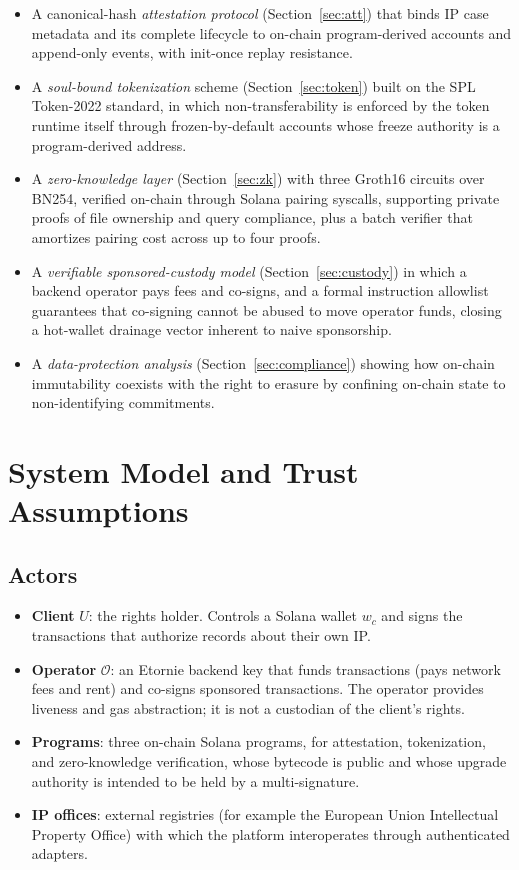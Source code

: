 \documentclass[conference]{IEEEtran}
\begin{document}
\begin{itemize}
\item A canonical-hash \emph{attestation protocol} (Section~\ref{sec:att})
that binds IP case metadata and its complete lifecycle to on-chain
program-derived accounts and append-only events, with init-once replay
resistance.
\item A \emph{soul-bound tokenization} scheme (Section~\ref{sec:token}) built
on the SPL Token-2022 standard, in which non-transferability is enforced by
the token runtime itself through frozen-by-default accounts whose freeze
authority is a program-derived address.
\item A \emph{zero-knowledge layer} (Section~\ref{sec:zk}) with three Groth16
circuits over BN254, verified on-chain through Solana pairing syscalls,
supporting private proofs of file ownership and query compliance, plus a
batch verifier that amortizes pairing cost across up to four proofs.
\item A \emph{verifiable sponsored-custody model} (Section~\ref{sec:custody})
in which a backend operator pays fees and co-signs, and a formal instruction
allowlist guarantees that co-signing cannot be abused to move operator funds,
closing a hot-wallet drainage vector inherent to naive sponsorship.
\item A \emph{data-protection analysis} (Section~\ref{sec:compliance})
showing how on-chain immutability coexists with the right to erasure by
confining on-chain state to non-identifying commitments.
\end{itemize}

\section{System Model and Trust Assumptions}
\label{sec:model}

\subsection{Actors}

\begin{itemize}
\item \textbf{Client} $U$: the rights holder. Controls a Solana wallet
$w_c$ and signs the transactions that authorize records about their own IP.
\item \textbf{Operator} $\mathcal{O}$: an Etornie backend key that funds
transactions (pays network fees and rent) and co-signs sponsored
transactions. The operator provides liveness and gas abstraction; it is not a
custodian of the client's rights.
\item \textbf{Programs}: three on-chain Solana programs, for attestation,
tokenization, and zero-knowledge verification, whose bytecode is public and
whose upgrade authority is intended to be held by a multi-signature.
\item \textbf{IP offices}: external registries (for example the European
Union Intellectual Property Office) with which the platform interoperates
through authenticated adapters.
\end{itemize}
\end{document}
